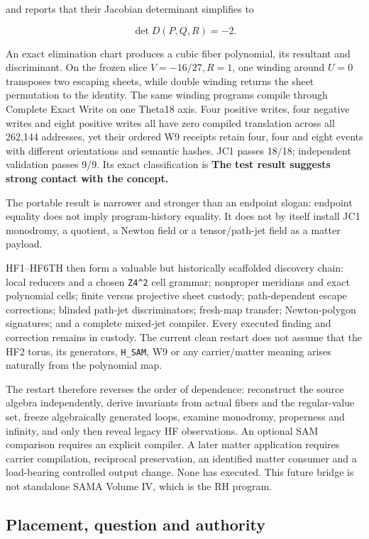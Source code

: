 and reports that their Jacobian determinant simplifies to

\[
\det D(P,Q,R)=-2.
\]

An exact elimination chart produces a cubic fiber polynomial, its
resultant and discriminant. On the frozen slice \(V=-16/27,R=1\), one
winding around \(U=0\) transposes two escaping sheets, while double
winding returns the sheet permutation to the identity. The same winding
programs compile through Complete Exact Write on one Theta18 axis. Four
positive writes, four negative writes and eight positive writes all have
zero compiled translation across all 262,144 addresses, yet their
ordered W9 receipts retain four, four and eight events with different
orientations and semantic hashes. JC1 passes 18/18; independent
validation passes 9/9. Its exact classification is \textbf{The test
result suggests strong contact with the concept.}

The portable result is narrower and stronger than an endpoint slogan:
endpoint equality does not imply program-history equality. It does not
by itself install JC1 monodromy, a quotient, a Newton field or a
tensor/path-jet field as a matter payload.

HF1--HF6TH then form a valuable but historically scaffolded discovery
chain: local reducers and a chosen \texttt{Z4\^{}2} cell grammar;
nonproper meridians and exact polynomial cells; finite versus projective
sheet custody; path-dependent escape corrections; blinded path-jet
discriminators; fresh-map transfer; Newton-polygon signatures; and a
complete mixed-jet compiler. Every executed finding and correction
remains in custody. The current clean restart does not assume that the
HF2 torus, its generators, \texttt{H\_SAM}, W9 or any carrier/matter
meaning arises naturally from the polynomial map.

The restart therefore reverses the order of dependence: reconstruct the
source algebra independently, derive invariants from actual fibers and
the regular-value set, freeze algebraically generated loops, examine
monodromy, properness and infinity, and only then reveal legacy HF
observations. An optional SAM comparison requires an explicit compiler.
A later matter application requires carrier compilation, reciprocal
preservation, an identified matter consumer and a load-bearing
controlled output change. None has executed. This future bridge is not
standalone SAMA Volume IV, which is the RH program.

\subsection{Placement, question and
authority}\label{viii-ch11-placement-question-and-authority}

